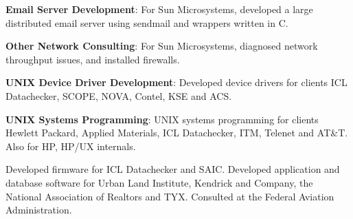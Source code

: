 \documentclass[12pt,margin,line]{res}
\newcommand{\internalskip}{\vspace{-.15in}}
\begin{document}
\begin{resume}
\internalskip
{\footnotesize\bf Email Server Development}:
For Sun Microsystems, developed a large distributed email server using
 sendmail and wrappers written in C.

\internalskip
{\footnotesize\bf Other Network Consulting}:
For Sun Microsystems, diagnosed network throughput issues, and installed
firewalls.

\internalskip
{\footnotesize\bf UNIX Device Driver Development}:
Developed device drivers for clients ICL Datachecker, SCOPE, NOVA, Contel,
KSE and ACS.

\internalskip
{\footnotesize\bf UNIX Systems Programming}:
UNIX systems programming for clients Hewlett Packard, Applied Materials,
ICL Datachecker, ITM, Telenet and AT\&T.
Also for HP, HP/UX internals.

\internalskip
Developed firmware for ICL Datachecker and SAIC.
Developed application and database software for Urban Land Institute, Kendrick
and Company, the National Association of Realtors and TYX.
Consulted at the Federal Aviation Administration.

\end{resume}
\end{document}
